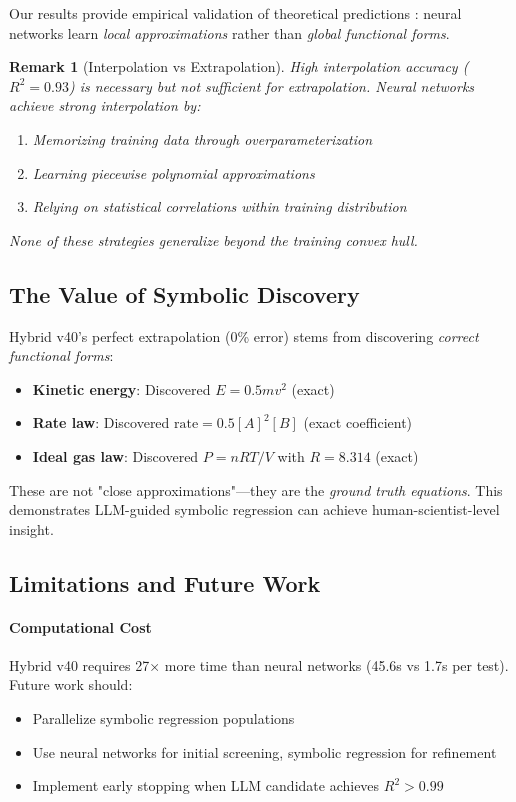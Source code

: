 \documentclass[twoside,11pt]{article}
\newtheorem{remark}{Remark}
\begin{document}
Our results provide empirical validation of theoretical predictions \citep{belkin2019reconciling, xu2020neural}: neural networks learn \emph{local approximations} rather than \emph{global functional forms}.

\begin{remark}[Interpolation vs Extrapolation]
High interpolation accuracy ($R^2 = 0.93$) is necessary but not sufficient for extrapolation. Neural networks achieve strong interpolation by:
\begin{enumerate}
    \item Memorizing training data through overparameterization
    \item Learning piecewise polynomial approximations
    \item Relying on statistical correlations within training distribution
\end{enumerate}
None of these strategies generalize beyond the training convex hull.
\end{remark}

\subsection{The Value of Symbolic Discovery}

Hybrid v40's perfect extrapolation (0\% error) stems from discovering \emph{correct functional forms}:

\begin{itemize}
    \item \textbf{Kinetic energy}: Discovered $E = 0.5mv^2$ (exact)
    \item \textbf{Rate law}: Discovered $\text{rate} = 0.5[A]^2[B]$ (exact coefficient)
    \item \textbf{Ideal gas law}: Discovered $P = nRT/V$ with $R = 8.314$ (exact)
\end{itemize}

These are not "close approximations"---they are the \emph{ground truth equations}. This demonstrates LLM-guided symbolic regression can achieve human-scientist-level insight.

\subsection{Limitations and Future Work}

\paragraph{Computational Cost} Hybrid v40 requires 27× more time than neural networks (45.6s vs 1.7s per test). Future work should:
\begin{itemize}
    \item Parallelize symbolic regression populations
    \item Use neural networks for initial screening, symbolic regression for refinement
    \item Implement early stopping when LLM candidate achieves $R^2 > 0.99$
\end{itemize}
\end{document}
